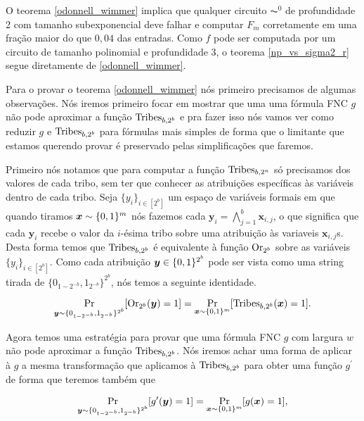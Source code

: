O teorema \ref{odonnell_wimmer} implica que qualquer circuito $\AC^{0}$ de profundidade 2 com tamanho subexponencial deve falhar e computar $F_{m}$ corretamente em uma fração maior do que $0,04$ das entradas. Como $f$ pode ser computada por um circuito de tamanho polinomial e profundidade 3, o teorema \ref{np_vs_sigma2_r} segue diretamente de \ref{odonnell_wimmer}.

Para o provar o teorema \ref{odonnell_wimmer} nós primeiro precisamos de algumas observações. Nós iremos primeiro focar em mostrar que uma uma fórmula FNC $g$ não pode aproximar a função $\text{Tribes}_{b, 2^{b}}$ e pra fazer isso nós vamos ver como reduzir $g$ e $\text{Tribes}_{b, 2^{b}}$ para fórmulas mais simples de forma que o limitante que estamos querendo provar é preservado pelas simplificações que faremos.

Primeiro nós notamos que para computar a função $\text{Tribes}_{b, 2^{n}}$ só precisamos dos valores de cada tribo, sem ter que conhecer as atribuições específicas às variáveis dentro de cada tribo. Seja $\{y_{i}\}_{i \in [2^{b}]}$ um espaço de variáveis formais em que quando tiramos $\boldsymbol{x} \sim \{0, 1\}^{m}$ nós fazemos cada $\boldsymbol{y}_{i} = \bigwedge_{j = 1}^{b} \boldsymbol{x}_{i, j}$, o que significa que cada $\boldsymbol{y}_{i}$ recebe o valor da $i$-ésima tribo sobre uma atribuição às variaveis $\boldsymbol{x}_{i, j}$s. Desta forma temos que $\text{Tribes}_{b, 2^{b}}$ é equivalente à função $\text{Or}_{2^{b}}$ sobre as variáveis $\{y_{i}\}_{i \in [2^{b}]}$. Como cada atribuição $\boldsymbol{y} \in \{0, 1\}^{2^{b}}$ pode ser vista como uma string tirada de $\{0_{1 - 2^{-b}}, 1_{2^{-b}}\}^{2^{b}}$, nós temos a seguinte identidade.

\begin{equation*}
    \Pr_{\boldsymbol{y} \sim \{0_{1 - 2^{-b}}, 1_{2^{-b}}\}^{2^{b}}} [\text{Or}_{2^{b}}(\boldsymbol{y}) = 1] = \Pr_{\boldsymbol{x} \sim \{0, 1\}^{m}}[\text{Tribes}_{b, 2^{b}}(\boldsymbol{x}) = 1].
\end{equation*}

Agora temos uma estratégia para provar que uma fórmula FNC $g$ com largura $w$ não pode aproximar a função $\text{Tribes}_{b, 2^{b}}$. Nós iremos achar uma forma de aplicar à $g$ a mesma transformação que aplicamos à $\text{Tribes}_{b, 2^{b}}$ para obter uma função $g^{\prime}$ de forma que teremos também que

\begin{equation*}
    \Pr_{\boldsymbol{y} \sim \{0_{1 - 2^{-b}}, 1_{2^{-b}} \}^{2^{b}}}[g^{\prime}(\boldsymbol{y}) = 1] = \Pr_{\boldsymbol{x} \sim \{0, 1\}^{m}}[g(\boldsymbol{x}) = 1],
\end{equation*}

